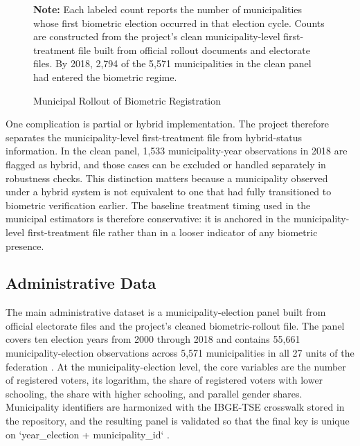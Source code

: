 \begin{figure}[htbp]
    \caption{Municipal Rollout of Biometric Registration}
    \label{fig:bvr-rollout}
    \centering
    
    \vspace{0.75em}
    \begin{minipage}{\textwidth}
        {\footnotesize \textbf{Note:} Each labeled count reports the number of municipalities whose first biometric election occurred in that election cycle. Counts are constructed from the project's clean municipality-level first-treatment file built from official \TSE{} rollout documents and electorate files. By 2018, 2,794 of the 5,571 municipalities in the clean panel had entered the biometric regime. \par}
    \end{minipage}
\end{figure}

One complication is partial or hybrid implementation. The project therefore separates the municipality-level first-treatment file from hybrid-status information. In the clean panel, 1,533 municipality-year observations in 2018 are flagged as hybrid, and those cases can be excluded or handled separately in robustness checks. This distinction matters because a municipality observed under a hybrid system is not equivalent to one that had fully transitioned to biometric verification earlier. The baseline treatment timing used in the municipal estimators is therefore conservative: it is anchored in the municipality-level first-treatment file rather than in a looser indicator of any biometric presence.

\subsection{Administrative Data}
\label{sec:data-and-measurement}

The main administrative dataset is a municipality-election panel built from official \TSE{} electorate files and the project's cleaned biometric-rollout file. The panel covers ten election years from 2000 through 2018 and contains 55,661 municipality-election observations across 5,571 municipalities in all 27 units of the federation \citep{tse_eleitorado}. At the municipality-election level, the core variables are the number of registered voters, its logarithm, the share of registered voters with lower schooling, the share with higher schooling, and parallel gender shares. Municipality identifiers are harmonized with the IBGE-TSE crosswalk stored in the repository, and the resulting panel is validated so that the final key is unique on `year_election + municipality_id` \citep{ibge_municipal}.

